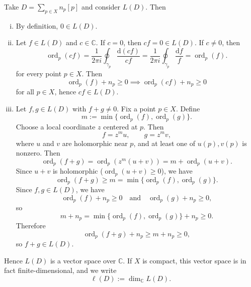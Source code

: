 \documentclass[11pt,openany]{article}
\renewcommand{\d}{\mathrm{d}} %
\newcommand{\ord}{\operatorname{ord}}
\begin{document}
\medskip

\medskip

\begin{remark}
	Take $D=\sum_{p\in X} n_p[p]$ and consider $L(D)$.
	Then \begin{enumerate}[(i)]
		\item By definition, $0\in L(D)$.
		\item Let $f\in L(D)$ and $c\in\mathbb C$. If $c=0$, then $cf=0\in L(D)$. If $c\neq 0$, then
		\[
		\ord_p(cf)
		=
		\frac{1}{2\pi i}\oint_{\gamma_p}\frac{\d(cf)}{cf}
		=
		\frac{1}{2\pi i}\oint_{\gamma_p}\frac{\d f}{f}
		=
		\ord_p(f).
		\] for every point $p\in X$. Then \[
		\ord_p(f)+n_p\ge 0\implies\ord_p(cf)+n_p\ge 0
		\] for all $p\in X$, hence $cf\in L(D)$.
		\item Let $f,g\in L(D)$ with $f+g\neq 0$. Fix a point $p\in X$. Define
		\[
		m:=\min\{\ord_p(f),\ord_p(g)\}.
		\]
		Choose a local coordinate $z$ centered at $p$. Then \[
		f=z^m u,
		\qquad
		g=z^m v,
		\]
		where $u$ and $v$ are holomorphic near $p$, and at least one of $u(p),v(p)$ is nonzero. Then
		\[
		\ord_p(f+g)=\ord_p(z^m(u+v))=m+\ord_p(u+v).
		\] Since $u+v$ is holomorphic ($\ord_p(u+v)\geq 0$), we have
		\[
		\ord_p(f+g)\ge m=\min\{\ord_p(f),\ord_p(g)\}.
		\]
		Since $f,g\in L(D)$, we have
		\[
		\ord_p(f)+n_p\ge 0
		\quad\text{and}\quad
		\ord_p(g)+n_p\ge 0,
		\] so
		\[
		m+n_p=\min\{\ord_p(f),\ord_p(g)\}+n_p\ge 0.
		\]
		Therefore
		\[
		\ord_p(f+g)+n_p\ge m+n_p\ge 0,
		\]
		so $f+g\in L(D)$.
	\end{enumerate}
	Hence $L(D)$ is a vector space over $\mathbb C$. If $X$ is compact, this vector space is in fact finite-dimensional, and we write \[
	\ell(D):=\dim_{\mathbb C}L(D).
	\]
\end{remark}
\end{document}
